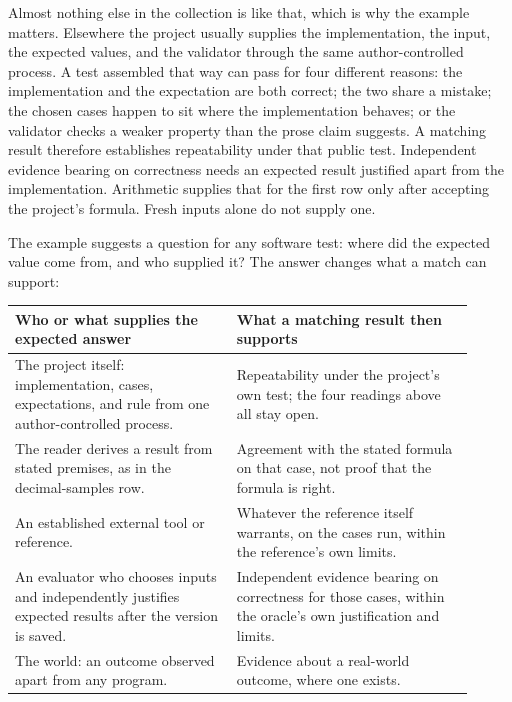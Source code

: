 \documentclass[11pt]{article}
\begin{document}
Almost nothing else in the collection is like that, which is why the example
matters. Elsewhere the project usually supplies the implementation, the
input, the expected values, and the validator through the same
author-controlled process. A test
assembled that way can pass for four different reasons: the implementation
and the expectation are both correct; the two share a mistake; the chosen
cases happen to sit where the implementation behaves; or the validator
checks a weaker property than the prose claim suggests. A matching result
therefore establishes repeatability under that public test. Independent
evidence bearing on correctness needs an expected result justified apart from
the implementation. Arithmetic supplies that for the first row only after
accepting the project's formula. Fresh inputs alone do not supply one.

The example suggests a question for any software test: where did the expected
value come from, and who supplied it? The answer changes what a match can
support:

\begin{center}
\small
\begin{tabular}{>{\raggedright\arraybackslash}p{0.44\linewidth}>{\raggedright\arraybackslash}p{0.47\linewidth}}
\toprule
\textbf{Who or what supplies the expected answer} & \textbf{What a matching result then supports} \\
\midrule
The project itself: implementation, cases, expectations, and rule from one author-controlled process. & Repeatability under the project's own test; the four readings above all stay open. \\
\addlinespace
The reader derives a result from stated premises, as in the decimal-samples row. & Agreement with the stated formula on that case, not proof that the formula is right. \\
\addlinespace
An established external tool or reference. & Whatever the reference itself warrants, on the cases run, within the reference's own limits. \\
\addlinespace
An evaluator who chooses inputs and independently justifies expected results after the version is saved. & Independent evidence bearing on correctness for those cases, within the oracle's own justification and limits. \\
\addlinespace
The world: an outcome observed apart from any program. & Evidence about a real-world outcome, where one exists. \\
\bottomrule
\end{tabular}
\end{center}
\end{document}

